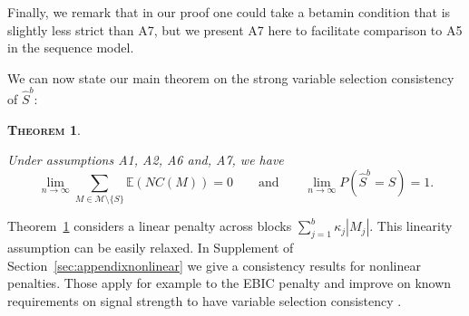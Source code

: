 \documentclass[aos]{imsart}
\theoremstyle{plain}
\newtheorem{thm}{\textsc{Theorem}}[section]
\newcommand{\david}[1]{{\small{\color{blue} \sf $\heartsuit$ David: #1}}}
\newcommand{\E}{\mathbb{E}}
\newcommand{\M}{\mathcal{M}}
\begin{document}
Finally, we remark that in our proof one could take a betamin condition that is slightly less strict than A7, but we present A7 here to facilitate comparison to A5 in the sequence model.  


We can now state our main theorem on the strong variable selection consistency of $\hat{S}^{b}$:
\begin{thm}\label{theo:suffcondlinearmodel}

Under assumptions A1, A2, A6 and, A7, we have
$$\lim_{n \to \infty} \sum_{M \in \M\setminus \{S\}}\E\left(NC(M)\right)= 0 \qquad \mbox{and} \qquad \lim_{n \to \infty} P(\hat{S}^b = S)= 1.$$
\end{thm}


Theorem~\ref{theo:suffcondlinearmodel} considers a linear penalty across blocks
$\sum_{j=1}^b \kappa_j|M_j|$. This linearity assumption can be easily relaxed. In Supplement of Section~\ref{sec:appendixnonlinear} we give a consistency results for nonlinear penalties. Those apply for example
to the EBIC penalty \citep{EBIC} and improve on known requirements on signal strength to have variable selection consistency \cite{ebicdiverging}.
\end{document}
